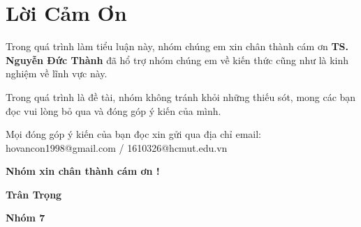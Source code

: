 \section*{Lời Cảm Ơn}

\hspace{1cm} Trong quá trình làm tiểu luận này, nhóm chúng em xin
chân thành cám ơn \textbf{TS. Nguyễn Đức Thành} đã hổ trợ nhóm chúng
em về kiến thức cũng như là kinh nghiệm về lĩnh vực này.

\hspace{1cm} Trong quá trình là đề tài, nhóm không tránh khỏi những thiếu
sót, mong các bạn đọc vui lòng bỏ qua và đóng góp ý kiến của mình.

\hspace{1cm} Mọi đóng góp ý kiến của bạn đọc xin gửi qua địa chỉ email: 
hovancon1998@gmail.com / 1610326@hcmut.edu.vn

\vspace{3cm}

\hspace{1cm} \textbf{Nhóm xin chân thành cám ơn !}

\hspace{1cm} \textbf{Trân Trọng}

\vspace{5cm}

\begin{flushright}
    \textbf{Nhóm 7}
 \end{flushright}